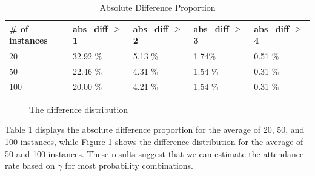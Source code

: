 \begin{table}[ht]
  \centering
  \caption{Absolute Difference Proportion}\label{tab_diff}
  \begin{tabular}{|l|l|l|l|l|}
  \hline
  \# of instances & abs\_diff $\geq$ 1 & abs\_diff $\geq$ 2 & abs\_diff $\geq$ 3 & abs\_diff $\geq$ 4 \\
  \hline
  20 & 32.92 \% & 5.13 \% & 1.74\% & 0.51 \% \\
  50 & 22.46 \% & 4.31 \% & 1.54 \% & 0.31 \%  \\
  100 & 20.00 \% & 4.21 \% & 1.54 \% & 0.31 \% \\
  \hline
  \end{tabular}
\end{table}

\begin{figure}[ht]
  \centering
  \caption{The difference distribution}
  \label{fig_diff}
\end{figure}

Table \ref{tab_diff} displays the absolute difference proportion for the average of 20, 50, and 100 instances, while Figure \ref{fig_diff} shows the difference distribution for the average of 50 and 100 instances. These results suggest that we can estimate the attendance rate based on $\gamma$ for most probability combinations.

